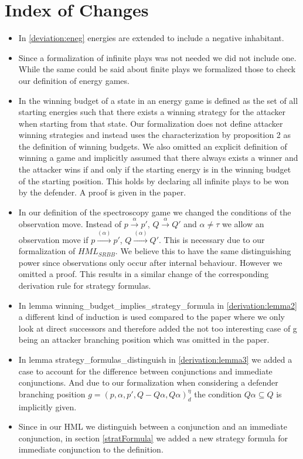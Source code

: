\section{Index of Changes}
\begin{itemize}
    \item In \ref{deviation:eneg} energies are extended to include a negative inhabitant. 
    \item Since a formalization of infinite plays was not needed we did not include one. While the same could be said about finite plays we formalized those to check our definition of energy games. 
    \item In \cite{bisping2023lineartimebranchingtime} the winning budget of a state in an energy game 
is defined as the set of all starting energies such that there exists a winning strategy for the attacker 
when starting from that state. Our formalization does not define attacker winning strategies and instead 
uses the characterization by proposition 2 \cite[p. 9]{bisping2023lineartimebranchingtime} as the definition of winning budgets.
We also omitted an explicit definition of winning a game and implicitly assumed that there 
always exists a winner and the attacker wins if and only if the starting energy is in the winning budget of the starting position. This holds by declaring all
infinite plays to be won by the defender. A proof is given in the paper. 
    \item In our definition of the spectroscopy game we changed the conditions of the observation move. 
    Instead of $p \overset{\alpha}{\longrightarrow}p'$, $Q \overset{\alpha}{\longrightarrow} Q'$ and $\alpha \neq \tau$
    we allow an observation move if  $p \overset{(\alpha)}{\longrightarrow}p'$, $Q \overset{(\alpha)}{\longrightarrow} Q'$.
    This is necessary due to our formalization of $HML_{SRBB}$. We believe this to have the same distinguishing power 
    since observations only occur after internal behaviour. However we omitted a proof. 
    This results in a similar change of the corresponding derivation rule for strategy formulas.
    \item In lemma winning\_budget\_implies\_strategy\_formula in \ref{derivation:lemma2} a different kind of induction is used compared to the paper 
    where we only look at direct successors and therefore added the not too interesting case of g being an 
    attacker branching position which was omitted in the paper.
   \item In lemma strategy\_formulas\_distinguish in  \ref{derivation:lemma3} we added a case to account for the difference between 
conjunctions and immediate conjunctions. And due to our formalization when considering a
defender branching position $g=(p,\alpha ,p', Q - Q\alpha, Q\alpha)_d^\eta$ the condition 
$Q \alpha \subseteq Q$ is implicitly given.
  \item Since in our HML we distinguish between a conjunction and an immediate conjunction, in section \ref{stratFormula} 
we added a new strategy formula for immediate conjunction to the definition.
\end{itemize}
